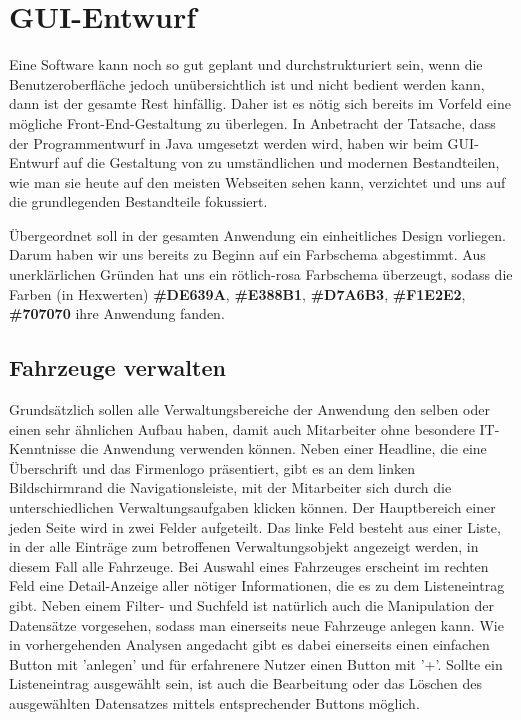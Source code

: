 \chapter{GUI-Entwurf}
\label{chapter:gui}

Eine Software kann noch so gut geplant und durchstrukturiert sein, wenn die Benutzeroberfläche jedoch unübersichtlich ist und nicht bedient werden kann, dann ist der gesamte Rest hinfällig. Daher ist es nötig sich bereits im Vorfeld eine mögliche Front-End-Gestaltung zu überlegen. In Anbetracht der Tatsache, dass der Programmentwurf in Java umgesetzt werden wird, haben wir beim GUI-Entwurf auf die Gestaltung von zu umständlichen und modernen Bestandteilen, wie man sie heute auf den meisten Webseiten sehen kann, verzichtet und uns auf die grundlegenden Bestandteile fokussiert. 


Übergeordnet soll in der gesamten Anwendung ein einheitliches Design vorliegen. Darum haben wir uns bereits zu Beginn auf ein Farbschema abgestimmt. Aus unerklärlichen Gründen hat uns ein rötlich-rosa Farbschema überzeugt, sodass die Farben (in Hexwerten) \textbf{\#DE639A}, \textbf{\#E388B1}, \textbf{\#D7A6B3}, \textbf{\#F1E2E2}, \textbf{\#707070} ihre Anwendung fanden. 

\section{Fahrzeuge verwalten}

Grundsätzlich sollen alle Verwaltungsbereiche der Anwendung den selben oder einen sehr ähnlichen Aufbau haben, damit auch Mitarbeiter ohne besondere IT-Kenntnisse die Anwendung verwenden können. Neben einer Headline, die eine Überschrift und das Firmenlogo präsentiert, gibt es an dem linken Bildschirmrand die Navigationsleiste, mit der Mitarbeiter sich durch die unterschiedlichen Verwaltungsaufgaben klicken können. Der Hauptbereich einer jeden Seite wird in zwei Felder aufgeteilt. Das linke Feld besteht aus einer Liste, in der alle Einträge zum betroffenen Verwaltungsobjekt angezeigt werden, in diesem Fall alle Fahrzeuge. Bei Auswahl eines Fahrzeuges erscheint im rechten Feld eine Detail-Anzeige aller nötiger Informationen, die es zu dem Listeneintrag gibt. Neben einem Filter- und Suchfeld ist natürlich auch die Manipulation der Datensätze vorgesehen, sodass man einerseits neue Fahrzeuge anlegen kann. Wie in vorhergehenden Analysen angedacht gibt es dabei einerseits einen einfachen Button mit 'anlegen' und für erfahrenere Nutzer einen Button mit '+'. Sollte ein Listeneintrag ausgewählt sein, ist auch die Bearbeitung oder das Löschen des ausgewählten Datensatzes mittels entsprechender Buttons möglich. 

